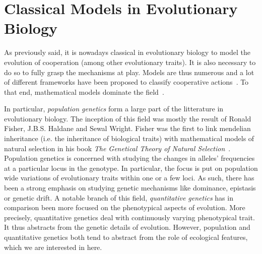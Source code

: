 

\section{Classical Models in Evolutionary Biology}

    As previously said, it is nowadays classical in evolutionary biology to model the evolution of cooperation (among other evolutionary traits). It is also necessary to do so to fully grasp the mechanisms at play.  Models are thus numerous and a lot of different frameworks have been proposed to classify cooperative actions~\parencite{Dugatkin2002, Sachs2004, Lehmann2006}. To that end, mathematical models dominate the field~\parencite{Servedio2014}. 

    In particular, \emph{population genetics} form a large part of the litterature in evolutionary biology. The inception of this field was mostly the result of Ronald Fisher, J.B.S. Haldane and Sewal Wright. Fisher was the first to link mendelian inheritance (i.e. the inheritance of biological traits) with mathematical models of natural selection in his book \textit{The Genetical Theory of Natural Selection}~\parencite{Fisher1930}. Population genetics is concerned with studying the changes in alleles' frequencies at a particular locus in the genotype. In particular, the focus is put on population wide variations of evolutionary traits within one or a few loci. As such, there has been a strong emphasis on studying genetic mechanisms like dominance, epistasis or genetic drift. A notable branch of this field, \emph{quantitative genetics} has in comparison been more focused on the phenotypical aspects of evolution. More precisely, quantitative genetics deal with continuously varying phenotypical trait. It thus abstracts from the genetic details of evolution. However, population and quantitative genetics both tend to abstract from the role of ecological features, which we are interested in here.




